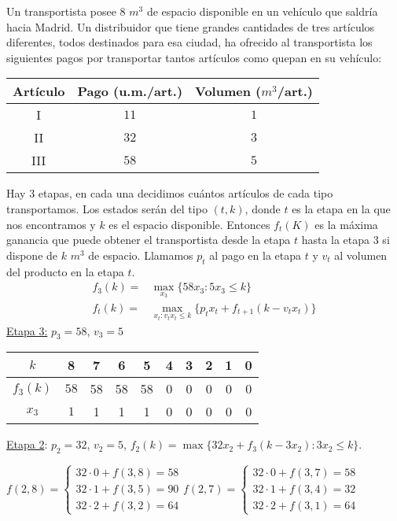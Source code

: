 \documentclass[twoside]{article}
\begin{document}
\newpage 
\begin{ejercicio}{2}
Un transportista posee $8$ $m^3$ de espacio disponible en un vehículo que saldría hacia Madrid.
Un distribuidor que tiene grandes cantidades de tres artículos diferentes, todos destinados para
esa ciudad, ha ofrecido al transportista los siguientes pagos por transportar tantos artículos como
quepan en su vehículo:

\begin{tabular}{c| c| c}
Artículo & Pago (u.m./art.) & Volumen ($m^3$/art.)\\
\hline
I & $11$ & $1$\\
II& $32$& $3$\\
III& $58$ & $5$\\

\end{tabular}

\begin{solucion}
Hay $3$ etapas, en cada una decidimos cuántos artículos de cada tipo transportamos. Los estados serán del tipo $(t,k)$, donde $t$ es la etapa en la que nos encontramos y $k$ es el espacio disponible. Entonces $f_t(K)$ es la máxima ganancia que puede obtener el transportista desde la etapa $t$ hasta la etapa $3$ si dispone de $k$ $m^3$ de espacio. Llamamos $p_t$ al pago en la etapa $t$ y $v_t$ al volumen del producto en la etapa $t$. 
\begin{align*}
f_3(k)=&\max_{x_3}\{58x_3: 5x_3\leq k\}\\
f_t(k)=&\max_{x_t:v_tx_t\leq k}\{p_tx_t+f_{t+1}(k-v_tx_t)\}
\end{align*}
\underline{Etapa 3:} $p_3=58$, $v_3=5$\

\begin{tabular}{c| c c c c c c c c c}
$k$ & 8 & 7 & 6 & 5 & 4 & 3 & 2 & 1 & 0\\
\hline
$f_3(k)$ & $58$ & 58 & 58 & 58 & 0 & 0 & 0 & 0 & 0\\
$x_3$ &  $1$ & 1 & 1 & 1& 0 & 0 & 0 & 0 & 0
\end{tabular}

\underline{Etapa 2}: $p_2=32$, $v_2=5$, $f_2(k)=\max\{32x_2+f_3(k-3x_2):3x_2\leq k\}$.

$f(2,8)=\begin{cases}
32\cdot 0+f(3,8)=58\\
32\cdot 1+f(3,5)=90\\
32\cdot 2+f(3,2)=64
\end{cases}$\quad $f(2,7)=\begin{cases}
32\cdot 0+f(3,7)=58\\
32\cdot 1+f(3,4)=32\\
32\cdot 2+f(3,1)=64
\end{cases}$


\end{solucion}
\end{ejercicio}
\end{document}

